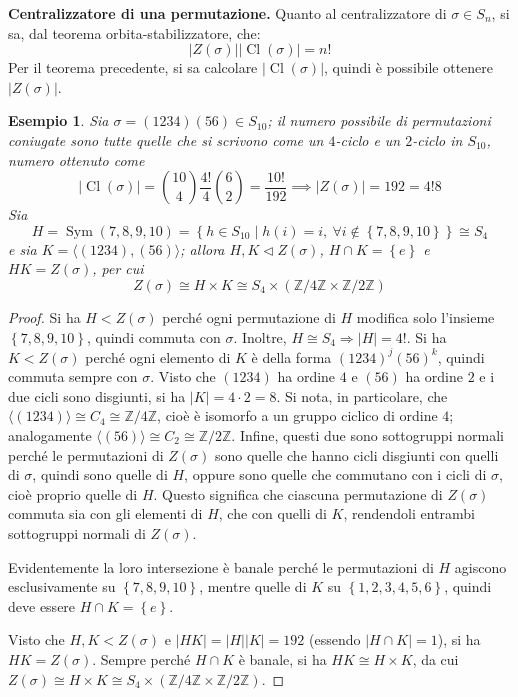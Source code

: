 \documentclass[12pt]{scrartcl}
\theoremstyle{style}
\newtheorem{esempio}{Esempio}[section]
\numberwithin{equation}{subsection}
\begin{document}
\textbf{Centralizzatore di una permutazione.} Quanto al centralizzatore di $\sigma \in S_n$, si sa, dal teorema orbita-stabilizzatore, che:
\begin{equation}
\lvert Z(\sigma ) \rvert \lvert \operatorname{Cl} (\sigma ) \rvert = n!
\end{equation}
Per il teorema precedente, si sa calcolare $\lvert \operatorname{Cl} (\sigma ) \rvert $, quindi \`e possibile ottenere $\lvert Z(\sigma ) \rvert $.
\begin{esempio}
Sia $\sigma = (1234)(56) \in S_{10}$; il numero possibile di permutazioni coniugate sono tutte quelle che si scrivono come un $4$-ciclo e un $2$-ciclo in $S_{10}$, numero ottenuto come
\[
	\lvert \operatorname{Cl} (\sigma ) \rvert  = \binom{10}{4}\frac{4!}{4} \binom{6}{2}= \frac{10!}{192}\implies \lvert Z(\sigma ) \rvert = 192 = 4! 8
\] 
Sia
\[
H = \operatorname{Sym} \left(7,8,9,10\right) =\left\{ h \in S_{10}  \mid h(i) = i, \ \forall i \not \in \left\{ 7,8,9,10 \right\}  \right\} \cong S_4
\] 
e sia $K = \langle (1234),(56) \rangle$; allora $H,K \lhd Z(\sigma )$, $H\cap K = \left\{ e \right\} $ e $HK=Z(\sigma )$, per cui
\[
Z(\sigma ) \cong H \times K \cong S_4 \times (\mathbb{Z}/4\mathbb{Z} \times \mathbb{Z}/2\mathbb{Z})
\] 
\end{esempio}
\begin{proof}
	Si ha $H <Z(\sigma )$ perch\'e ogni permutazione di $H$ modifica solo l'insieme $\left\{ 7,8,9,10 \right\} $, quindi commuta con $\sigma $. Inoltre, $H \cong S_4 \Rightarrow \lvert H \rvert  = 4!$.
	Si ha $K<Z(\sigma )$ perch\'e ogni elemento di $K$ \`e della forma $(1234)^j(56)^k$, quindi commuta sempre con $\sigma $.
	Visto che $(1234)$ ha ordine $4$ e $(56)$ ha ordine $2$ e i due cicli sono disgiunti, si ha $\lvert K \rvert = 4 \cdot 2=8$.
	Si nota, in particolare, che $\langle (1234) \rangle\cong C_4\cong\mathbb{Z}/4\mathbb{Z}$, cio\`e \`e isomorfo a un gruppo ciclico di ordine $4$; analogamente $\langle (56) \rangle\cong C_2\cong\mathbb{Z}/2\mathbb{Z}$.
	Infine, questi due sono sottogruppi normali perch\'e le permutazioni di $Z(\sigma )$ sono quelle che hanno cicli disgiunti con quelli di $\sigma $, quindi sono quelle di $H$, oppure sono quelle che commutano con i cicli di $\sigma $, cio\`e proprio quelle di $H$.
	Questo significa che ciascuna permutazione di $Z(\sigma )$ commuta sia con gli elementi di $H$, che con quelli di $K$, rendendoli entrambi sottogruppi normali di $Z(\sigma )$.

	Evidentemente la loro intersezione \`e banale perch\'e le permutazioni di $H$ agiscono esclusivamente su $\left\{ 7,8,9,10 \right\} $, mentre quelle di $K$ su $\left\{ 1,2,3,4,5,6 \right\} $, quindi deve essere $H\cap K = \left\{ e \right\} $.

	Visto che $H,K < Z(\sigma )$ e $\lvert HK \rvert = \lvert H \rvert \lvert K \rvert =192 $ (essendo $\lvert H\cap K \rvert = 1$), si ha $HK = Z(\sigma )$.
	Sempre perch\'e $H\cap K$ \`e banale, si ha $HK \cong H \times K$, da cui $Z(\sigma ) \cong H \times K \cong S_4 \times (\mathbb{Z}/4\mathbb{Z} \times  \mathbb{Z}/2\mathbb{Z})$.
\end{proof}
\end{document}
